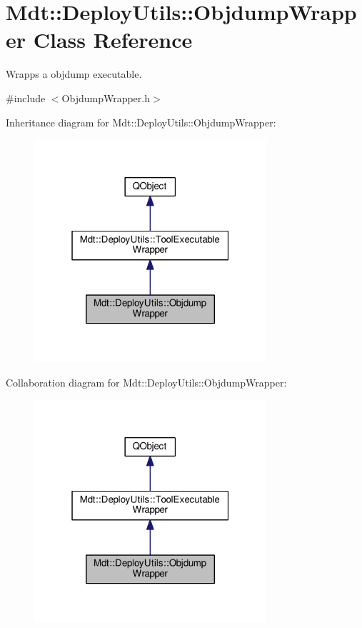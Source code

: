 \hypertarget{class_mdt_1_1_deploy_utils_1_1_objdump_wrapper}{}\section{Mdt\+:\+:Deploy\+Utils\+:\+:Objdump\+Wrapper Class Reference}
\label{class_mdt_1_1_deploy_utils_1_1_objdump_wrapper}


Wrapps a objdump executable.  




{\ttfamily \#include $<$Objdump\+Wrapper.\+h$>$}



Inheritance diagram for Mdt\+:\+:Deploy\+Utils\+:\+:Objdump\+Wrapper\+:
\nopagebreak
\begin{figure}[H]
\begin{center}
\leavevmode
\includegraphics[width=244pt]{class_mdt_1_1_deploy_utils_1_1_objdump_wrapper__inherit__graph}
\end{center}
\end{figure}


Collaboration diagram for Mdt\+:\+:Deploy\+Utils\+:\+:Objdump\+Wrapper\+:
\nopagebreak
\begin{figure}[H]
\begin{center}
\leavevmode
\includegraphics[width=244pt]{class_mdt_1_1_deploy_utils_1_1_objdump_wrapper__coll__graph}
\end{center}
\end{figure}
